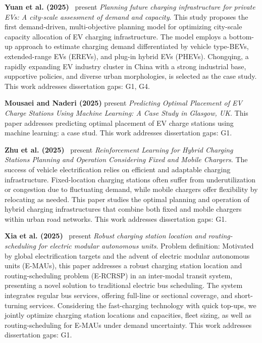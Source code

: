 \documentclass[letterpaper, 12pt, oneside, doublespacing]{Thesis}
\begin{document}
\noindent \textbf{Yuan et al. (2025)}~\cite{planning_future_2025} present \textit{Planning future charging infrastructure for private EVs: A city-scale assessment of demand and capacity}. This study proposes the first demand-driven, multi-objective planning model for optimizing city-scale capacity allocation of EV charging infrastructure. The model employs a bottom-up approach to estimate charging demand differentiated by vehicle type-BEVs, extended-range EVs (EREVs), and plug-in hybrid EVs (PHEVs). Chongqing, a rapidly expanding EV industry cluster in China with a strong industrial base, supportive policies, and diverse urban morphologies, is selected as the case study. This work addresses dissertation gaps: G1, G4.



\noindent \textbf{Mousaei and Naderi (2025)} present \textit{Predicting Optimal Placement of EV Charge Stations Using Machine Learning: A Case Study in Glasgow, UK}. This paper addresses predicting optimal placement of EV charge stations using machine learning: a case stud. This work addresses dissertation gaps: G1.



\noindent \textbf{Zhu et al. (2025)}~\cite{reinforcement_learning_2025} present \textit{Reinforcement Learning for Hybrid Charging Stations Planning and Operation Considering Fixed and Mobile Chargers}. The success of vehicle electrification relies on efficient and adaptable charging infrastructure. Fixed-location charging stations often suffer from underutilization or congestion due to fluctuating demand, while mobile chargers offer flexibility by relocating as needed. This paper studies the optimal planning and operation of hybrid charging infrastructures that combine both fixed and mobile chargers within urban road networks. This work addresses dissertation gaps: G1.



\noindent \textbf{Xia et al. (2025)}~\cite{robust_charging_2025} present \textit{Robust charging station location and routing-scheduling for electric modular autonomous units}. Problem definition: Motivated by global electrification targets and the advent of electric modular autonomous units (E-MAUs), this paper addresses a robust charging station location and routing-scheduling problem (E-RCRSP) in an inter-modal transit system, presenting a novel solution to traditional electric bus scheduling. The system integrates regular bus services, offering full-line or sectional coverage, and short-turning services. Considering the fast-charging technology with quick top-ups, we jointly optimize charging station locations and capacities, fleet sizing, as well as routing-scheduling for E-MAUs under demand uncertainty. This work addresses dissertation gaps: G1.
\end{document}
